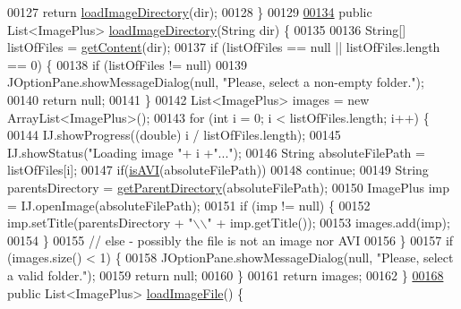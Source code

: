\begin{DoxyCode}
00127     \textcolor{keywordflow}{return} \hyperlink{classfunctions_1_1_file_manager_a0f8b52da290ba020437d01d4873b1d2c}{loadImageDirectory}(dir);
00128   \}
00129   
\hypertarget{_file_manager_8java_source_l00134}{}\hyperlink{classfunctions_1_1_file_manager_ae7538dc1fbe0b999be0a86e196de6851}{00134}   \textcolor{keyword}{public} List<ImagePlus> \hyperlink{classfunctions_1_1_file_manager_ae7538dc1fbe0b999be0a86e196de6851}{loadImageDirectory}(String dir) \{
00135 
00136     String[] listOfFiles = \hyperlink{classfunctions_1_1_file_manager_a8d912a4b181b284e6c05e0f44f541e48}{getContent}(dir);
00137     \textcolor{keywordflow}{if} (listOfFiles == null || listOfFiles.length == 0) \{
00138       \textcolor{keywordflow}{if} (listOfFiles != null)
00139         JOptionPane.showMessageDialog(null, \textcolor{stringliteral}{"Please, select a non-empty folder."});
00140       \textcolor{keywordflow}{return} null;
00141     \}
00142     List<ImagePlus> images = \textcolor{keyword}{new} ArrayList<ImagePlus>();
00143     \textcolor{keywordflow}{for} (\textcolor{keywordtype}{int} i = 0; i < listOfFiles.length; i++) \{
00144       IJ.showProgress((\textcolor{keywordtype}{double}) i / listOfFiles.length);
00145       IJ.showStatus(\textcolor{stringliteral}{"Loading image "}+ i +\textcolor{stringliteral}{"..."});
00146       String absoluteFilePath = listOfFiles[i];
00147       \textcolor{keywordflow}{if}(\hyperlink{classfunctions_1_1_file_manager_aef15c5bfadc70a7333a3103e85e7bf65}{isAVI}(absoluteFilePath))
00148         \textcolor{keywordflow}{continue};
00149       String parentsDirectory = \hyperlink{classfunctions_1_1_file_manager_aa9e15d838c5a7a0e3906d9ceec253398}{getParentDirectory}(absoluteFilePath);
00150       ImagePlus imp = IJ.openImage(absoluteFilePath);
00151       \textcolor{keywordflow}{if} (imp != null) \{
00152         imp.setTitle(parentsDirectory + \textcolor{stringliteral}{"\(\backslash\)\(\backslash\)"} + imp.getTitle());
00153         images.add(imp);
00154       \}
00155       \textcolor{comment}{// else - possibly the file is not an image nor AVI}
00156     \}
00157     \textcolor{keywordflow}{if} (images.size() < 1) \{
00158       JOptionPane.showMessageDialog(null, \textcolor{stringliteral}{"Please, select a valid folder."});
00159       \textcolor{keywordflow}{return} null;
00160     \}
00161     \textcolor{keywordflow}{return} images;
00162   \}
\hypertarget{_file_manager_8java_source_l00168}{}\hyperlink{classfunctions_1_1_file_manager_a10f7f3b24be48586ca7455ebac6abcd7}{00168}   \textcolor{keyword}{public} List<ImagePlus> \hyperlink{classfunctions_1_1_file_manager_a10f7f3b24be48586ca7455ebac6abcd7}{loadImageFile}() \{

\end{DoxyCode}
